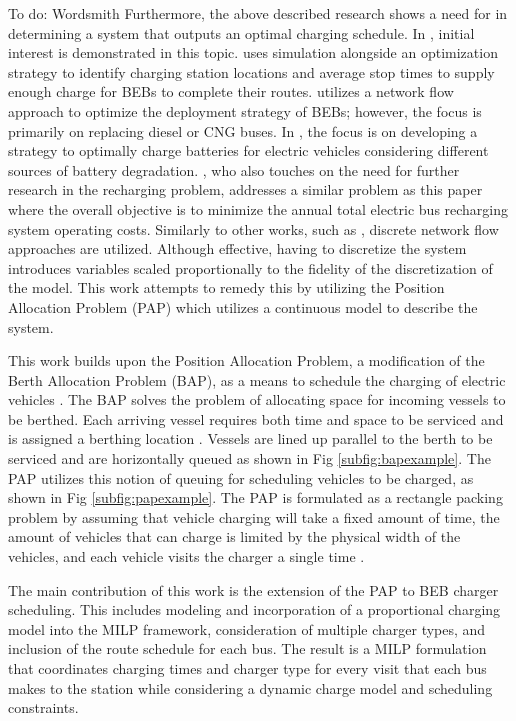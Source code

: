 \documentclass[letterpaper, 10pt, conference]{IEEEtran}
\newcommand{\TODO}[1]{{\color{green} To do: #1}}                                %
\begin{document}
\TODO{Wordsmith} Furthermore, the above described research shows a need for in determining a system that outputs an
optimal charging schedule. In \cite{Wei2018, Sebastiani2016, Wang2017}, initial interest is demonstrated in this topic.
\cite{Sebastiani2016} uses simulation alongside an optimization strategy to identify charging station locations and
average stop times to supply enough charge for BEBs to complete their routes. \cite{Wei2018} utilizes a network flow
approach to optimize the deployment strategy of BEBs; however, the focus is primarily on replacing diesel or CNG buses.
In \cite{Hoke2014}, the focus is on developing a strategy to optimally charge batteries for electric vehicles
considering different sources of battery degradation. \cite{Wang2017}, who also touches on the need for further research
in the recharging problem, addresses a similar problem as this paper where the overall objective is to minimize the
annual total electric bus recharging system operating costs. Similarly to other works, such as \cite{Wei2018}, discrete
network flow approaches are utilized. Although effective, having to discretize the system introduces variables scaled
proportionally to the fidelity of the discretization of the model. This work attempts to remedy this by utilizing the
Position Allocation Problem (PAP) which utilizes a continuous model to describe the system.

This work builds upon the Position Allocation Problem, a modification of the Berth Allocation Problem (BAP), as a means
to schedule the charging of electric vehicles \cite{Qarebagh2019}. The BAP solves the problem of allocating space for
incoming vessels to be berthed. Each arriving vessel requires both time and space to be serviced and is assigned a
berthing location \cite{Imai2001}. Vessels are lined up parallel to the berth to be serviced and are horizontally queued
as shown in Fig \ref{subfig:bapexample}. The PAP utilizes this notion of queuing for scheduling vehicles to be charged,
as shown in Fig \ref{subfig:papexample}. The PAP is formulated as a rectangle packing problem by assuming that vehicle
charging will take a fixed amount of time, the amount of vehicles that can charge is limited by the physical width of
the vehicles, and each vehicle visits the charger a single time \cite{Qarebagh2019}.

The main contribution of this work is the extension of the PAP to BEB charger scheduling. This includes modeling and
incorporation of a proportional charging model into the MILP framework, consideration of multiple charger types, and
inclusion of the route schedule for each bus. The result is a MILP formulation that coordinates charging times and
charger type for every visit that each bus makes to the station while considering a dynamic charge model and scheduling
constraints.
\end{document}
